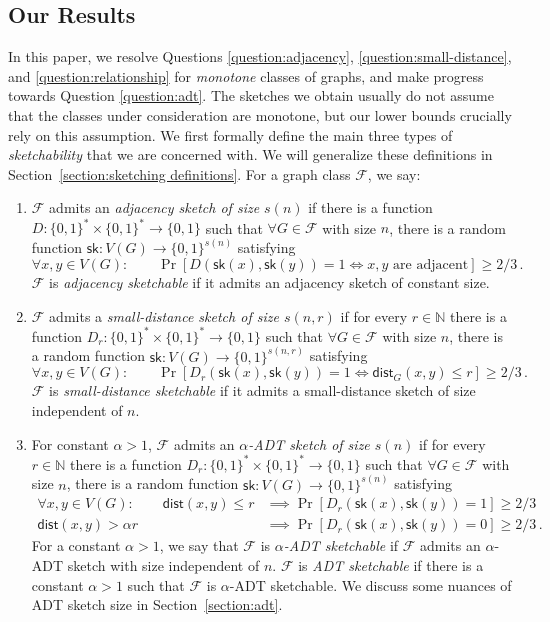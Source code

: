 \documentclass[11pt]{article}
\theoremstyle{definition}
\newcommand{\zo}{\{0,1\}}
\newcommand{\sk}{\mathsf{sk}}
\renewcommand{\leq}{\leqslant}
\renewcommand{\geq}{\geqslant}
\def\F {{\mathcal F}}
\def\bN{{\mathbb N}}
\def\sk {\mathsf{sk}}
\newcommand{\dist}{\mathsf{dist}}
\begin{document}
\subsection{Our Results}
\label{section:results}
In this paper, we resolve Questions \ref{question:adjacency}, \ref{question:small-distance}, and
\ref{question:relationship} for \emph{monotone} classes of graphs, and make progress towards
Question \ref{question:adt}. The sketches we obtain usually do not assume that the
classes under consideration are monotone, but our lower bounds
crucially rely on this assumption. We first formally define the main three types of \emph{sketchability} that
we are concerned with. We will generalize these definitions in Section~\ref{section:sketching
definitions}.  For a graph class $\F$, we say:
\begin{enumerate}[itemsep=0pt]
\item $\F$ admits an \emph{adjacency sketch of size $s(n)$} if there is a function $D : \zo^* \times
\zo^* \to \zo$ such that $\forall G \in \F$ with size $n$, there is a random function $\sk : V(G)
\to \zo^{s(n)}$ satisfying
\[
  \forall x,y \in V(G) : \qquad
    \Pr\left[ D(\sk(x), \sk(y)) = 1 \iff x, y \text{ are adjacent} \right] \geq 2/3 \,.
\]
$\F$ is \emph{adjacency sketchable} if it admits an adjacency sketch of constant size.
\item $\F$ admits a \emph{small-distance sketch of size $s(n,r)$} if for every $r \in \bN$ there is
a function $D_r : \zo^* \times \zo^* \to \zo$ such that $\forall G \in \F$ with size $n$, there is a
random function $\sk : V(G) \to \zo^{s(n,r)}$ satisfying
\[
  \forall x,y \in V(G) : \qquad
    \Pr\left[ D_r(\sk(x), \sk(y)) = 1 \iff \dist_G(x,y) \leq r \right] \geq 2/3 \,.
\]
$\F$ is \emph{small-distance sketchable} if it admits a small-distance sketch of size
independent of $n$.
\item For constant $\alpha > 1$, $\F$ admits an \emph{$\alpha$-ADT sketch of size $s(n)$} if for
every $r \in \bN$ there is a function $D_r : \zo^* \times \zo^* \to \zo$ such that $\forall G \in
\F$ with size $n$, there is a random function $\sk : V(G) \to \zo^{s(n)}$ satisfying
\begin{align*}
  \forall x,y \in V(G) : \qquad
    \dist(x,y) \leq r &\implies \Pr\left[ D_r(\sk(x), \sk(y)) = 1 \right] \geq 2/3 \\
    \dist(x,y) > \alpha r &\implies \Pr\left[ D_r(\sk(x), \sk(y)) = 0 \right] \geq 2/3 \,.
\end{align*}
For a constant $\alpha > 1$, we say that $\F$ is \emph{$\alpha$-ADT sketchable} if $\F$ admits an
$\alpha$-ADT sketch with size independent of $n$. $\F$ is
\emph{ADT sketchable} if there is a constant $\alpha > 1$ such that
$\F$ is $\alpha$-ADT sketchable.
We discuss some nuances of ADT sketch
size in Section~\ref{section:adt}.
\end{enumerate}
\end{document}
